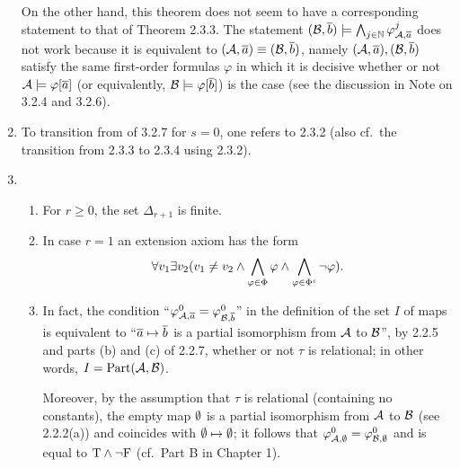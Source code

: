 \begin{enumerate}[1.]
On the other hand, this theorem does not seem to have a corresponding statement  to that of Theorem 2.3.3. The statement $(\mathcal{B}, \overline{b}) \models \bigwedge_{j \in \mathbb{N}} \varphi^{j}_{\mathcal{A}, \overline{a}}$ does not work because it is equivalent to $(\strct{A}, \vect{a}) \equv (\strct{B}, \vect{b})$, namely $(\mathcal{A}, \overline{a}), (\mathcal{B}, \overline{b})$ satisfy the same first-order formulas $\varphi$ in which it is decisive whether or not $\mathcal{A} \models \varphi[\overline{a}]$ (or equivalently, $\mathcal{B} \models \varphi[\overline{b}]$) is the case (see the discussion in Note on 3.2.4 and 3.2.6).
%
\item {} To transition from  of 3.2.7 for $s = 0$, one refers to 2.3.2 (also cf.\ the transition from 2.3.3 to 2.3.4 using 2.3.2).
%
\item {}
\begin{enumerate}[(1)]
\item For $r \geq 0$, the set $\Delta_{r + 1}$ is finite.
\item In case $r = 1$ an extension axiom has the form
\[
\forall v_1 \exists v_2 (v_1 \neq v_2 \land \bigwedge_{\varphi \in \Phi} \varphi \land \bigwedge_{\varphi \in \Phi^\mathit{c}} \neg\varphi).
\]
\item In fact, the condition ``$\varphi^{0}_{\mathcal{A}, \overline{a}} = \varphi^{0}_{\mathcal{B}, \overline{b}}$'' in the definition of the set $I$ of maps is equivalent to ``$\overline{a} \mapsto \overline{b}$ is a partial isomorphism from $\mathcal{A}$ to $\mathcal{B}$'', by 2.2.5 and parts (b) and (c) of 2.2.7, whether or not $\tau$ is relational; in other words, $I = \mathrm{Part}(\mathcal{A}, \mathcal{B})$.

Moreover, by the assumption that $\tau$ is relational (containing no constants), the empty map $\emptyset$ is a partial isomorphism from $\mathcal{A}$ to $\mathcal{B}$ (see 2.2.2(a)) and coincides with $\emptyset \mapsto \emptyset$; it follows that $\varphi^{0}_{\mathcal{A}, \emptyset} = \varphi^{0}_{\mathcal{B}, \emptyset}$ and is equal to $\mathrm{T} \land \neg\mathrm{F}$ (cf.\ Part B in Chapter 1).


\end{enumerate}
\end{enumerate}
